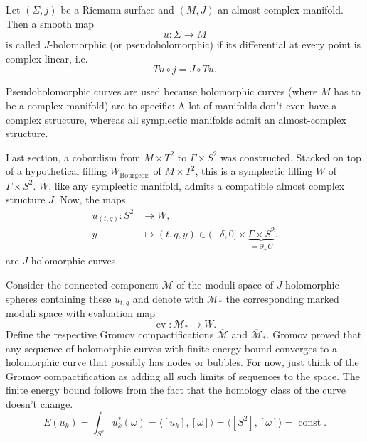 \begin{definition}
    Let $(\Sigma, j)$ be a Riemann surface and $(M, J)$ an almost-complex manifold. Then a smooth map
    \[
        u \colon \Sigma \to M
    \]
    is called $J$-holomorphic (or pseudoholomorphic) if its differential at every point is complex-linear, i.e.
    \[
        Tu \circ j = J \circ Tu.
    \]
\end{definition}

Pseudoholomorphic curves are used because holomorphic curves (where $M$ has to be a complex manifold) are to specific: 
A lot of manifolds don't even have a complex structure, whereas all symplectic manifolds admit an almost-complex structure.

%

Last section, a cobordism from $M\times T^2$ to $\Gamma \times S^2$ was constructed.
Stacked on top of a hypothetical filling $W_\text{Bourgeois}$ of $M\times T^2$, this is a symplectic filling $W$ of $\Gamma \times S^2$.
$W$, like any symplectic manifold, admits a compatible almost complex structure $J$.
Now, the maps
\begin{align*}
    u_{(t,q)} \colon S^2 &\to W,\\
    y &\mapsto (t, q, y) \in (-\delta, 0] \times \underbrace{\Gamma \times S^2}_{= \partial_+ C}.
\end{align*}
are $J$-holomorphic curves.

Consider the connected component $\mathcal{M}$ of the moduli space of $J$-holomorphic spheres containing these $u_{t,q}$
and denote with $\mathcal{M}_*$ the corresponding marked moduli space with evaluation map
\[
    \operatorname{ev}\colon \mathcal{M}_* \to W.
\]
Define the respective Gromov compactifications $\overline{\mathcal{M}}$ and $\overline{\mathcal{M}}_*$.
Gromov proved that any sequence of holomorphic curves with finite energy bound converges to a
holomorphic curve that possibly has nodes or bubbles.
For now, just think of the Gromov compactification as adding all such limits of sequences to the space.
The finite energy bound follows from the fact that the homology class of the curve doesn't change.
\[
    E(u_k) = \int_{S^2} u_k^*(\omega) = \langle [u_k], [\omega] \rangle = \langle [S^2], [\omega]\rangle = \operatorname{const}.
\]

